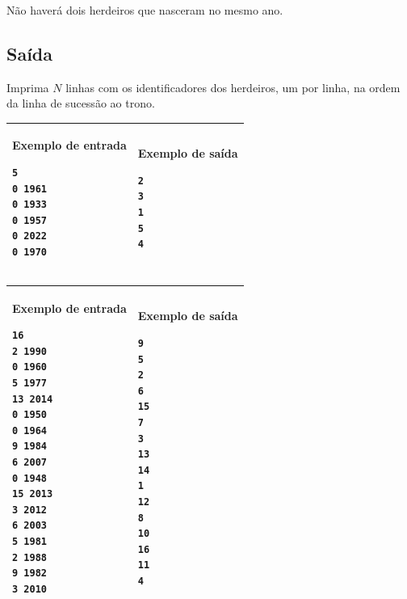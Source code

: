Não haverá dois herdeiros que nasceram no mesmo ano.

\subsection*{Saída}

Imprima $N$ linhas com os identificadores dos herdeiros, um por linha, na ordem
da linha de sucessão ao trono.

\newpage
\begin{table}[!h]
\centering
\begin{tabular}{|l|l|}
\hline
\begin{minipage}[t]{3in}
\textbf{Exemplo de entrada}
\begin{verbatim}
5
0 1961
0 1933
0 1957
0 2022
0 1970
\end{verbatim}
\vspace{1mm}
\end{minipage}
&
\begin{minipage}[t]{3in}
\textbf{Exemplo de saída}
\begin{verbatim}
2
3
1
5
4
\end{verbatim}
\vspace{1mm}
\end{minipage} \\
\hline
\end{tabular}
\end{table}



\begin{table}[!h]
\centering
\begin{tabular}{|l|l|}
\hline
\begin{minipage}[t]{3in}
\textbf{Exemplo de entrada}
\begin{verbatim}
16
2 1990
0 1960
5 1977
13 2014
0 1950
0 1964
9 1984
6 2007
0 1948
15 2013
3 2012
6 2003
5 1981
2 1988
9 1982
3 2010
\end{verbatim}
\vspace{1mm}
\end{minipage}
&
\begin{minipage}[t]{3in}
\textbf{Exemplo de saída}
\begin{verbatim}
9
5
2
6
15
7
3
13
14
1
12
8
10
16
11
4
\end{verbatim}
\vspace{1mm}
\end{minipage} \\
\hline
\end{tabular}
\end{table}

